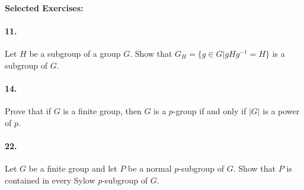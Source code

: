 \documentclass[10pt,a4paper]{article}
\begin{document}
\paragraph{Selected Exercises:}

\paragraph{11.} Let $H$ be a subgroup of a group $G$. Show that $G_H = \{ g \in G | gHg^{-1} = H\}$ is a subgroup of $G$.

\paragraph{14.} Prove that if $G$ is a finite group, then $G$ is a $p$-group if and only if $|G|$ is a power of $p$.

\paragraph{22.} Let $G$ be a finite group and let $P$ be a normal $p$-subgroup of $G$. Show that $P$ is contained in every Sylow $p$-subgroup of $G$.
\end{document}

